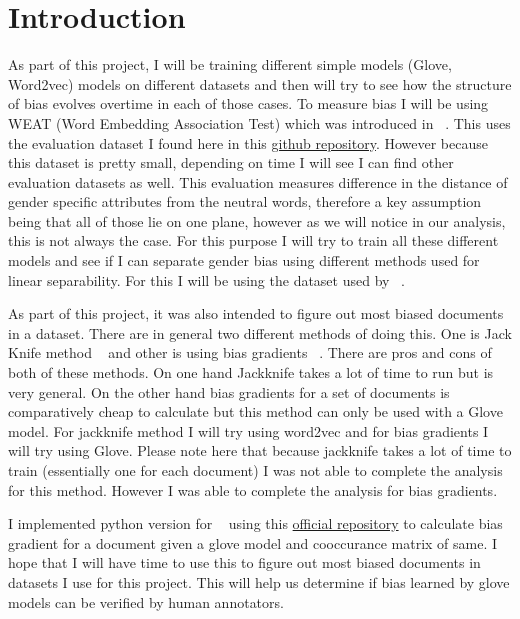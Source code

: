 \documentclass{article}
\begin{document}
\section{Introduction}

As part of this project, I will be training different simple models (Glove, Word2vec) models on different datasets and then will try to see how the structure of bias evolves overtime in each of those cases. To measure bias I will be using WEAT (Word Embedding Association Test) which was introduced in ~\cite{caliskan_semantics_2017}. This uses the evaluation dataset I found here in this \href{https://github.com/chadaeun/weat_replication/tree/master/weat}{github repository}. However because this dataset is pretty small, depending on time I will see I can find other evaluation datasets as well. This evaluation measures difference in the distance of gender specific attributes from the neutral words, therefore a key assumption being that all of those lie on one plane, however as we will notice in our analysis, this is not always the case. For this purpose I will try to train all these different models and see if I can separate gender bias using different methods used for linear separability. For this I will be using the dataset used by ~\cite{garg_word_2018}.


As part of this project, it was also intended to figure out most biased documents in a dataset. There are in general two different methods of doing this. One is Jack Knife method ~\cite{https://doi.org/10.48550/arxiv.1709.06183} and other is using bias gradients ~\cite{brunet_understanding_2019}. There are pros and cons of both of these methods. On one hand Jackknife takes a lot of time to run but is very general. On the other hand bias gradients for a set of documents is comparatively cheap to calculate but this method can only be used with a Glove model. For jackknife method I will try using word2vec and for bias gradients I will try using Glove. Please note here that because jackknife takes a lot of time to train (essentially one for each document) I was not able to complete the analysis for this method. However I was able to complete the analysis for bias gradients.


I implemented python version for ~\cite{brunet_understanding_2019} using this \href{https://github.com/mebrunet/understanding-bias}{official repository} to calculate bias gradient for a document given a glove model and cooccurance matrix of same. I hope that I will have time to use this to figure out most biased documents in datasets I use for this project. This will help us determine if bias learned by glove models can be verified by human annotators.
\end{document}
